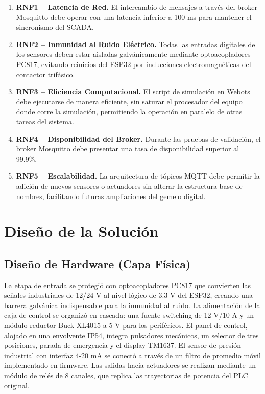 \begin{enumerate}
    \item \textbf{RNF1 – Latencia de Red.} El intercambio de mensajes a través del broker Mosquitto debe operar con una latencia inferior a 100 ms para mantener el sincronismo del SCADA.
    \item \textbf{RNF2 – Inmunidad al Ruido Eléctrico.} Todas las entradas digitales de los sensores deben estar aisladas galvánicamente mediante optoacopladores PC817, evitando reinicios del ESP32 por inducciones electromagnéticas del contactor trifásico.
    \item \textbf{RNF3 – Eficiencia Computacional.} El script de simulación en Webots debe ejecutarse de manera eficiente, sin saturar el procesador del equipo donde corre la simulación, permitiendo la operación en paralelo de otras tareas del sistema.
    \item \textbf{RNF4 – Disponibilidad del Broker.} Durante las pruebas de validación, el broker Mosquitto debe presentar una tasa de disponibilidad superior al 99.9\%.
    \item \textbf{RNF5 – Escalabilidad.} La arquitectura de tópicos MQTT debe permitir la adición de nuevos sensores o actuadores sin alterar la estructura base de nombres, facilitando futuras ampliaciones del gemelo digital.
\end{enumerate}

\section{Diseño de la Solución}
\label{sec:diseno_solucion}

\subsection{Diseño de Hardware (Capa Física)}

La etapa de entrada se protegió con optoacopladores PC817 que convierten las señales industriales de 12/24 V al nivel lógico de 3.3 V del ESP32, creando una barrera galvánica indispensable para la inmunidad al ruido. La alimentación de la caja de control se organizó en cascada: una fuente switching de 12 V/10 A y un módulo reductor Buck XL4015 a 5 V para los periféricos. El panel de control, alojado en una envolvente IP54, integra pulsadores mecánicos, un selector de tres posiciones, parada de emergencia y el display TM1637. El sensor de presión industrial con interfaz 4-20 mA se conectó a través de un filtro de promedio móvil implementado en firmware. Las salidas hacia actuadores se realizan mediante un módulo de relés de 8 canales, que replica las trayectorias de potencia del PLC original.

